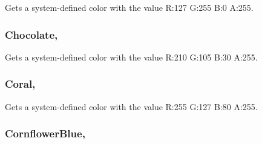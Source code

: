 Gets a system-\/defined color with the value R\+:127 G\+:255 B\+:0 A\+:255.

\hypertarget{structMicrosoft_1_1Xna_1_1Framework_1_1Color_aef6aca8c50909cac60a9509a31d4cf31}{}
\subsubsection[{Chocolate}]{ Chocolate\hspace{0.3cm}{\ttfamily [static]}, {\ttfamily [get]}}\label{structMicrosoft_1_1Xna_1_1Framework_1_1Color_aef6aca8c50909cac60a9509a31d4cf31}


Gets a system-\/defined color with the value R\+:210 G\+:105 B\+:30 A\+:255.

\hypertarget{structMicrosoft_1_1Xna_1_1Framework_1_1Color_a7ed2d6db43798975ecb31d89024d02c7}{}
\subsubsection[{Coral}]{ Coral\hspace{0.3cm}{\ttfamily [static]}, {\ttfamily [get]}}\label{structMicrosoft_1_1Xna_1_1Framework_1_1Color_a7ed2d6db43798975ecb31d89024d02c7}


Gets a system-\/defined color with the value R\+:255 G\+:127 B\+:80 A\+:255.

\hypertarget{structMicrosoft_1_1Xna_1_1Framework_1_1Color_abd16398ca99ec33233fc4ed536bf8037}{}
\subsubsection[{Cornflower\+Blue}]{ Cornflower\+Blue\hspace{0.3cm}{\ttfamily [static]}, {\ttfamily [get]}}\label{structMicrosoft_1_1Xna_1_1Framework_1_1Color_abd16398ca99ec33233fc4ed536bf8037}


